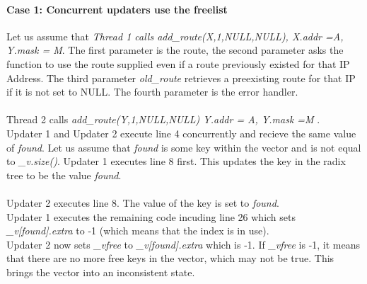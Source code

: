 \documentclass{article}
\begin{document}
\paragraph{Case 1: Concurrent updaters use the freelist}
Let us assume that \emph{Thread 1 calls add\_route(X,1,NULL,NULL), X.addr =A, Y.mask = M}. The first parameter is the route, the second parameter asks the function to use the route supplied even if a route previously existed for that IP Address. The third parameter \emph{old\_route} retrieves a preexisting route for that IP if it is not set to NULL. The fourth parameter is the error handler.\\
\\Thread 2 calls \emph{add\_route(Y,1,NULL,NULL) Y.addr = A, Y.mask =M} .
\\Updater 1 and Updater 2 execute line 4 concurrently and recieve the same value of \emph{found}. Let us assume that \emph{found} is some key within the vector and is not equal to \emph{\_v.size()}. Updater 1 executes line 8 first. This updates the key in the radix tree to be the value \emph{found}.\\
\\Updater 2 executes line 8. The value of the key is set to \emph{found}.
\\Updater 1 executes the remaining code incuding line 26 which sets \emph{\_v[found].extra} to -1 (which means that the index is in use).
\\Updater 2 now sets \emph{\_vfree} to \emph{\_v[found].extra} which is -1. If \emph{\_vfree} is -1, it means that there are no more free keys in the vector, which may not be true. This brings the vector into an inconsistent state.
\\
\end{document}
